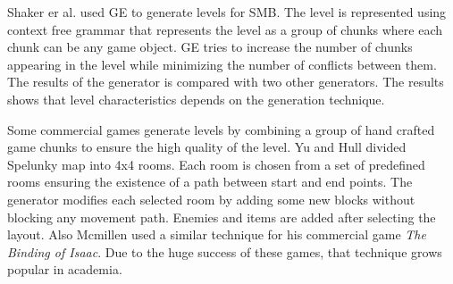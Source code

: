 Shaker er al.\cite{grammarSMB} used GE to generate levels for SMB. The level is represented using context free grammar that represents the level as a group of chunks where each chunk can be any game object. GE tries to increase the number of chunks appearing in the level while minimizing the number of conflicts between them. The results of the generator is compared with two other generators. The results shows that level characteristics depends on the generation technique.\\\par

Some commercial games generate levels by combining a group of hand crafted game chunks to ensure the high quality of the level. Yu and Hull\cite{spelunkyTechnique} divided Spelunky map into 4x4 rooms. Each room is chosen from a set of predefined rooms ensuring the existence of a path between start and end points. The generator modifies each selected room by adding some new blocks without blocking any movement path. Enemies and items are added after selecting the layout. Also Mcmillen\cite{theBindingOfIsaacTechnique} used a similar technique for his commercial game \emph{The Binding of Isaac}. Due to the huge success of these games, that technique grows popular in academia.\\\par

